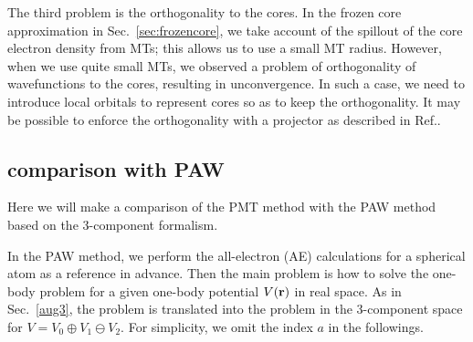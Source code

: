 \documentclass[a4paper,10pt,aip,onecolumn,amsmath,amssymb,floatfix,rmp]{revtex4-1}
\newcommand{\bfr}{{\bf r}}
\newcommand{\refsec}[1]{\mbox{Sec.~\!\ref{#1}}}
\begin{document}
The third problem is the orthogonality to the cores. 
In the frozen core approximation in \refsec{sec:frozencore}, 
we take account of the spillout of the core electron density 
from MTs; this allows us to use a small MT radius.
However, when we use quite small MTs, we observed a problem of orthogonality
of wavefunctions to the cores, resulting in unconvergence. In such a case, 
we  need to introduce local orbitals to represent cores so as to keep
the orthogonality. It may be possible to enforce the orthogonality 
with a projector as described in Ref..


\subsection{comparison with PAW}
\label{sec:comparison}
Here we will make a comparison of the PMT method with the PAW method
\cite{PAW,kresse99} based on the 3-component formalism.

In the PAW method, we perform the all-electron (AE) 
calculations for a spherical atom as a reference in advance.
Then the main problem is how to solve the one-body problem
for a given one-body potential $V(\bfr)$ in real space. 
As in \refsec{aug3}, the problem is translated into the problem in the 3-component space
for $V=V_0\oplus V_1 \ominus V_2$.
For simplicity, we omit the index $a$ in the followings.
\end{document}
